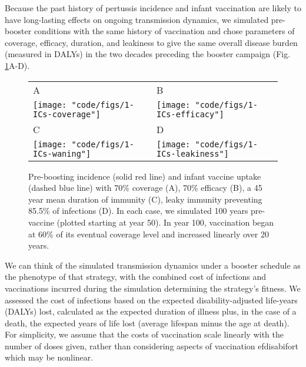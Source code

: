 \documentclass[12pt]{article}
\begin{document}
Because the past history of pertussis incidence and infant vaccination are likely to have long-lasting effects on 
ongoing transmission dynamics\cite{Riolo_et:2013}, we simulated pre-booster conditions with the same history of vaccination
and chose parameters of coverage, efficacy, duration, and leakiness
to give the same overall disease burden (measured in DALYs) 
in the two decades preceding the booster campaign (Fig. \ref{fig:IC}A-D).

\begin{figure}

\begin{tabular}{ll}
A&B\\
\texttt{[image: "code/figs/1-ICs-coverage"]}&
\texttt{[image: "code/figs/1-ICs-efficacy"]} \\
C&D\\
\texttt{[image: "code/figs/1-ICs-waning"]}&
\texttt{[image: "code/figs/1-ICs-leakiness"]}\\
\end{tabular}

\caption{\footnotesize Pre-boosting incidence (solid red line) and infant vaccine uptake (dashed blue line)
 with 70\% coverage (A), 70\% efficacy (B),
a 45 year mean duration of immunity (C),  
leaky immunity preventing 85.5\% of infections (D). In each case, 
we simulated 100 years pre-vaccine (plotted starting at year 50).
In year 100, vaccination began at 60\% of its eventual coverage level 
and increased linearly over 20 years. 
}

\label{fig:IC}
\end{figure}



We can think of the simulated transmission dynamics 
under a booster schedule as the
phenotype of that strategy, with
the combined cost of infections and vaccinations
incurred during the simulation determining the strategy's fitness. 
We assessed the cost of infections based on the expected
disability-adjusted life-years (DALYs) lost, calculated as
the expected duration of illness
plus, in the case of a death,
the expected years of life lost
(average lifespan minus the age at death).
For simplicity, we assume that the costs of vaccination scale
linearly with the number of doses given, rather than
considering aspects of vaccination efdisabifort which
may be nonlinear.
\end{document}
